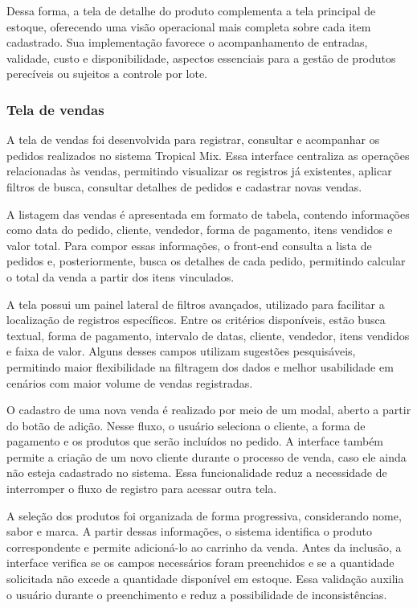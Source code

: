 Dessa forma, a tela de detalhe do produto complementa a tela principal de estoque, oferecendo uma visão operacional mais completa sobre cada item cadastrado. Sua implementação favorece o acompanhamento de entradas, validade, custo e disponibilidade, aspectos essenciais para a gestão de produtos perecíveis ou sujeitos a controle por lote.

\subsubsection{Tela de vendas}

A tela de vendas foi desenvolvida para registrar, consultar e acompanhar os pedidos realizados no sistema Tropical Mix. Essa interface centraliza as operações relacionadas às vendas, permitindo visualizar os registros já existentes, aplicar filtros de busca, consultar detalhes de pedidos e cadastrar novas vendas.

A listagem das vendas é apresentada em formato de tabela, contendo informações como data do pedido, cliente, vendedor, forma de pagamento, itens vendidos e valor total. Para compor essas informações, o front-end consulta a lista de pedidos e, posteriormente, busca os detalhes de cada pedido, permitindo calcular o total da venda a partir dos itens vinculados.

A tela possui um painel lateral de filtros avançados, utilizado para facilitar a localização de registros específicos. Entre os critérios disponíveis, estão busca textual, forma de pagamento, intervalo de datas, cliente, vendedor, itens vendidos e faixa de valor. Alguns desses campos utilizam sugestões pesquisáveis, permitindo maior flexibilidade na filtragem dos dados e melhor usabilidade em cenários com maior volume de vendas registradas.

O cadastro de uma nova venda é realizado por meio de um modal, aberto a partir do botão de adição. Nesse fluxo, o usuário seleciona o cliente, a forma de pagamento e os produtos que serão incluídos no pedido. A interface também permite a criação de um novo cliente durante o processo de venda, caso ele ainda não esteja cadastrado no sistema. Essa funcionalidade reduz a necessidade de interromper o fluxo de registro para acessar outra tela.

A seleção dos produtos foi organizada de forma progressiva, considerando nome, sabor e marca. A partir dessas informações, o sistema identifica o produto correspondente e permite adicioná-lo ao carrinho da venda. Antes da inclusão, a interface verifica se os campos necessários foram preenchidos e se a quantidade solicitada não excede a quantidade disponível em estoque. Essa validação auxilia o usuário durante o preenchimento e reduz a possibilidade de inconsistências.

